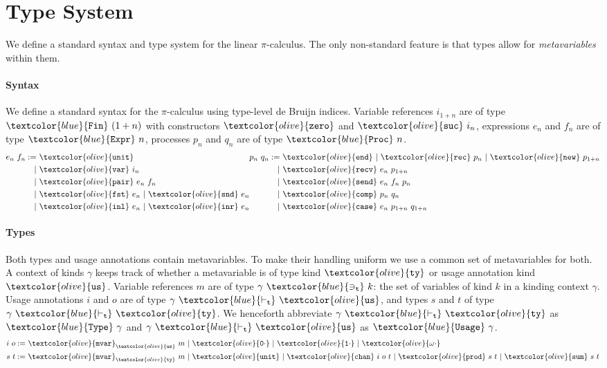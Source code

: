\documentclass[sigplan,screen,review]{acmart}
\theoremstyle{definition}\newtheorem{mytheorem}{Theorem}[section]
\newcommand{\picalc}{$\pi$-calculus}
\newcommand{\constr}[1]{\textcolor{olive}{\mathtt{#1}}}
\newcommand{\type}[1]{\textcolor{blue}{\mathtt{#1}}}
\newcommand{\Fin}[1]{\type{Fin}~#1}
\newcommand{\fzero}{\constr{zero}}
\newcommand{\fsuc}{\constr{suc}}
\newcommand{\sExpr}[1]{\type{Expr}~#1}
\newcommand{\sProc}[1]{\type{Proc}~#1}
\newcommand{\tvar}[2]{#1 ~\type{\ni_t}~ #2}
\newcommand{\tkind}[2]{#1 ~\type{\vdash_t}~ #2}
\newcommand{\ttype}[1]{\type{Type}~#1}
\newcommand{\tusage}[1]{\type{Usage}~#1}
\newcommand{\sunit}{\constr{unit}}
\newcommand{\svar}{\constr{var}}
\newcommand{\sfst}{\constr{fst}}
\newcommand{\ssnd}{\constr{snd}}
\newcommand{\sinl}{\constr{inl}}
\newcommand{\sinr}{\constr{inr}}
\newcommand{\spair}{\constr{pair}}
\newcommand{\send}{\constr{end}}
\newcommand{\snew}{\constr{new}}
\newcommand{\scomp}{\constr{comp}}
\newcommand{\srecv}{\constr{recv}}
\newcommand{\ssend}{\constr{send}}
\newcommand{\scase}{\constr{case}}
\newcommand{\srec}{\constr{rec}}
\newcommand{\ktype}{\constr{ty}}
\newcommand{\kusage}{\constr{us}}
\newcommand{\tmvar}{\constr{mvar}}
\newcommand{\tchan}{\constr{chan}}
\newcommand{\tunit}{\constr{unit}}
\newcommand{\tsum}{\constr{sum}}
\newcommand{\tprod}{\constr{prod}}
\newcommand{\tzero}{\constr{0\cdot}}
\newcommand{\tone}{\constr{1\cdot}}
\newcommand{\tomega}{\constr{\omega\cdot}}
\begin{document}
\section{Type System}
\label{type-system}

We define a standard syntax and type system for the linear \picalc{}.
The only non-standard feature is that types allow for \emph{metavariables} within them.

\paragraph{Syntax}

We define a standard syntax for the \picalc{} using type-level de Bruijn indices.
Variable references $i_{1+n}$ are of type $\Fin{(1 + n)}$ with constructors $\fzero$ and $\fsuc~i_n$, expressions $e_n$ and $f_n$ are of type $\sExpr{n}$, processes $p_n$ and $q_n$ are of type $\sProc{n}$.
\[
\begin{aligned}[c]
  e_n ~ f_n  :=
  &~ \sunit \\
  |&~ \svar~i_n \\
  |&~ \spair~e_n~f_n \\
  |&~ \sfst~e_n ~|~  \ssnd~e_n \\
  |&~ \sinl~e_n ~|~  \sinr~e_n
\end{aligned}
\begin{aligned}[c]
  p_n ~ q_n  :=
  &~ \send ~|~  \srec~p_n ~|~ \snew~p_{1+n} \\
  |&~ \srecv~e_n~p_{1+n} \\
  |&~ \ssend~e_n~f_n~p_n \\
  |&~ \scomp~p_n~q_n \\
  |&~ \scase~e_n~p_{1+n}~q_{1+n} \\
\end{aligned}
\]

\paragraph{Types}
\label{types}


Both types and usage annotations contain metavariables.
To make their handling uniform we use a common set of metavariables for both.
A context of kinds \(\gamma\) keeps track of whether a metavariable is of type kind $\ktype$ or usage annotation kind $\kusage$.
Variable references $m$ are of type $\tvar{\gamma}{k}$: the set of variables of kind \(k\) in a kinding context \(\gamma\).
Usage annotations $i$ and $o$ are of type $\tkind{\gamma}{\kusage}$, and types $s$ and $t$ of type $\tkind{\gamma}{\ktype}$.
We henceforth abbreviate $\tkind{\gamma}{\ktype}$ as $\ttype{\gamma}$ and $\tkind{\gamma}{\kusage}$ as $\tusage{\gamma}$.
\[
\begin{aligned}[c]
  i ~ o :=& ~ \tmvar_{\kusage} ~ m ~|~ \tzero ~|~ \tone ~|~ \tomega \\
  s ~ t :=& ~ \tmvar_{\ktype} ~ m ~|~ \tunit ~|~ \tchan ~ i ~ o ~ t ~|~ \tprod ~ s ~ t ~|~ \tsum ~ s ~ t
\end{aligned}
\]
\end{document}
